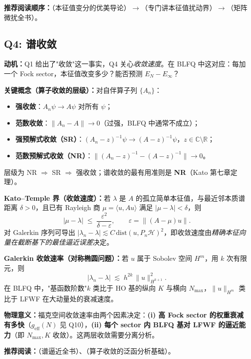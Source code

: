 \documentclass{article}
\begin{document}
\textbf{推荐阅读顺序：}\cite{Bhatia_1997}（本征值变分的优美导论）$\to$\cite{Bhatia_2007}（专门讲本征值扰动界）$\to$\cite{Stewart_Sun_1990}（矩阵微扰全书）。

\subsection{Q4: 谱收敛}

\textbf{动机：}Q1 给出了"收敛"这一事实，Q4 关心\emph{收敛速度}。在 BLFQ 中这对应：每加一个 Fock sector，本征值改变多少？能否预测 $E_{N}-E_{\infty}$？

\textbf{关键概念（算子收敛的层级）：}对自伴算子列 $\{A_{n}\}$：
\begin{itemize}
    \item \textbf{强收敛}：$A_{n}\psi\to A\psi$ 对所有 $\psi$；
    \item \textbf{范数收敛}：$\|A_{n}-A\|\to 0$（过强，BLFQ 中通常不成立）；
    \item \textbf{强预解式收敛（SR）}：$(A_{n}-z)^{-1}\psi\to(A-z)^{-1}\psi$，$z\in\mathbb{C}\setminus\mathbb{R}$；
    \item \textbf{范数预解式收敛（NR）}：$\|(A_{n}-z)^{-1}-(A-z)^{-1}\|\to 0$。
\end{itemize}
层级为 NR $\Rightarrow$ SR $\Rightarrow$ 强收敛；谱收敛的最有用准则是 \textbf{NR}（Kato 第七章定理）。

\textbf{Kato--Temple 界（收敛速度）：}若 $\lambda$ 是 $A$ 的孤立简单本征值，与最近邻本质谱距离 $\delta>0$，且已有 Rayleigh 商 $\mu=\langle u,Au\rangle$ 满足 $|\mu-\lambda|<\delta$，则
\[
|\mu-\lambda|\;\le\;\frac{\varepsilon^{2}}{\delta-\varepsilon},\qquad \varepsilon=\|(A-\mu)u\|.
\]
对 Galerkin 序列可导出 $|\lambda_{n}-\lambda|\lesssim C\,\mathrm{dist}(u,P_{n}\mathcal{H})^{2}$，即收敛速度由\emph{精确本征向量在截断基下的最佳逼近误差}决定。

\textbf{Galerkin 收敛速率（对称椭圆问题）：}若 $u$ 属于 Sobolev 空间 $H^{m}$，用 $k$ 次有限元，则
\[
|\lambda_{n}-\lambda| \;\lesssim\; h^{2k}\,\|u\|_{H^{k+1}}^{2}.
\]
在 BLFQ 中，"基函数阶数"$k$ 类比于 HO 基的纵向 $K$ 与横向 $N_{\max}$，$\|u\|_{H^{m}}$ 类比于 LFWF 在大动量处的衰减速度。

\textbf{物理意义：}福克空间收敛速率由两个因素决定：\textbf{(i) 高 Fock sector 的权重衰减有多快}（$g_{\mathrm{eff}}(N)$ 见 Q10），\textbf{(ii) 每个 sector 内 BLFQ 基对 LFWF 的逼近能力}（即 $N_{\max},K$ 收敛）。这两层收敛需要分离分析。

\textbf{推荐阅读：}\cite{Chatelin_1983}（谱逼近全书）、\cite{Reed_Simon_1978}（算子收敛的泛函分析基础）。
\end{document}
